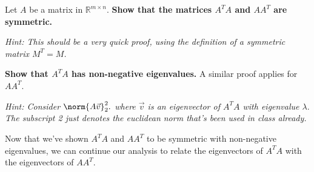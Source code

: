 \begin{enumerate}

  \qitem Let $A$ be a matrix in $\mathbb{R}^{m \times n}$. \textbf{Show that the matrices $A^T A$ and $A A^T$ are symmetric.}

  \textit{Hint: This should be a very quick proof, using the definition of a symmetric matrix $M^{T} = M$. }

  \ws{\vspace{50px}}

  \qitem \textbf{Show that $A^T A$ has non-negative eigenvalues.} A similar proof applies for $A A^T$.

  \textit{Hint: Consider $\norm{A\vec{v}}_{2}^{2}.$ where $\vec{v}$ is an eigenvector of $A^{T}A$ with eigenvalue $\lambda.$ The subscript 2 just denotes the euclidean norm that's been used in class already.}

  \ws{\vspace{75px}}

\end{enumerate}

Now that we've shown $A^T A$ and $A A^T$ to be symmetric with non-negative eigenvalues, we can continue our analysis to relate the eigenvectors of $A^T A$ with the eigenvectors of $A A^T$.

